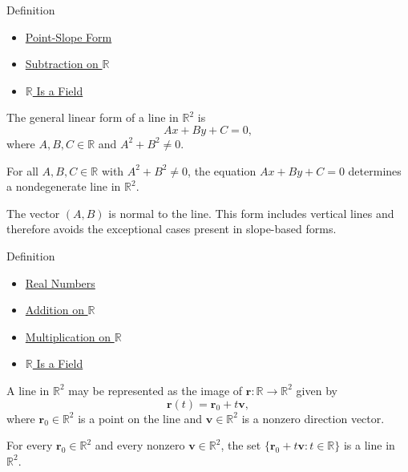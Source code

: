 \begin{definitionbox}{Definition}

\begin{dependencies}
\begin{itemize}
  \item \hyperref[def:point-slope-form]{Point-Slope Form}
  \item \hyperref[def:subtraction-on-r]{Subtraction on $\mathbb{R}$}
  \item \hyperref[thm:r-is-a-field]{$\mathbb{R}$ Is a Field}
\end{itemize}
\end{dependencies}
\begin{definition}
\label{def:general-linear-form}
The general linear form of a line in $\mathbb{R}^2$ is
\[
  Ax+By+C=0,
\]
where $A,B,C\in\mathbb{R}$ and $A^2+B^2\neq 0$.
\end{definition}
\end{definitionbox}\begin{remark*}
For all $A,B,C\in\mathbb{R}$ with $A^2+B^2\neq 0$, the equation
$Ax+By+C=0$ determines a nondegenerate line in $\mathbb{R}^2$.
\end{remark*}

\begin{remark*}[Interpretation]
The vector $(A,B)$ is normal to the line. This form includes vertical lines
and therefore avoids the exceptional cases present in slope-based forms.
\end{remark*}

\begin{definitionbox}{Definition}

\begin{dependencies}
\begin{itemize}
  \item \hyperref[def:reals]{Real Numbers}
  \item \hyperref[def:addition-on-r]{Addition on $\mathbb{R}$}
  \item \hyperref[def:multiplication-on-r]{Multiplication on $\mathbb{R}$}
  \item \hyperref[thm:r-is-a-field]{$\mathbb{R}$ Is a Field}
\end{itemize}
\end{dependencies}
\begin{definition}
\label{def:vector-parametric-form}
A line in $\mathbb{R}^2$ may be represented as the image of
$\mathbf r:\mathbb{R}\to\mathbb{R}^2$ given by
\[
  \mathbf r(t)=\mathbf r_0+t\mathbf v,
\]
where $\mathbf r_0\in\mathbb{R}^2$ is a point on the line and
$\mathbf v\in\mathbb{R}^2$ is a nonzero direction vector.
\end{definition}
\end{definitionbox}\begin{remark*}
For every $\mathbf r_0\in\mathbb{R}^2$ and every nonzero
$\mathbf v\in\mathbb{R}^2$, the set
$\{\mathbf r_0+t\mathbf v:t\in\mathbb{R}\}$ is a line in $\mathbb{R}^2$.
\end{remark*}

